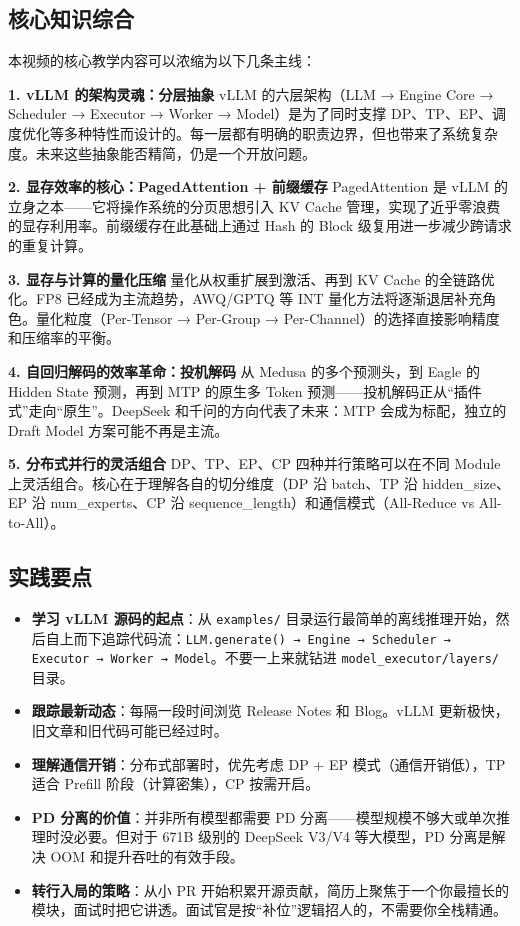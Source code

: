 \documentclass[a4paper]{article}
\begin{document}
\subsection{核心知识综合}

本视频的核心教学内容可以浓缩为以下几条主线：

\textbf{1. vLLM 的架构灵魂：分层抽象}
vLLM 的六层架构（LLM → Engine Core → Scheduler → Executor → Worker → Model）是为了同时支撑 DP、TP、EP、调度优化等多种特性而设计的。每一层都有明确的职责边界，但也带来了系统复杂度。未来这些抽象能否精简，仍是一个开放问题。

\textbf{2. 显存效率的核心：PagedAttention + 前缀缓存}
PagedAttention 是 vLLM 的立身之本——它将操作系统的分页思想引入 KV Cache 管理，实现了近乎零浪费的显存利用率。前缀缓存在此基础上通过 Hash 的 Block 级复用进一步减少跨请求的重复计算。

\textbf{3. 显存与计算的量化压缩}
量化从权重扩展到激活、再到 KV Cache 的全链路优化。FP8 已经成为主流趋势，AWQ/GPTQ 等 INT 量化方法将逐渐退居补充角色。量化粒度（Per-Tensor → Per-Group → Per-Channel）的选择直接影响精度和压缩率的平衡。

\textbf{4. 自回归解码的效率革命：投机解码}
从 Medusa 的多个预测头，到 Eagle 的 Hidden State 预测，再到 MTP 的原生多 Token 预测——投机解码正从``插件式''走向``原生''。DeepSeek 和千问的方向代表了未来：MTP 会成为标配，独立的 Draft Model 方案可能不再是主流。

\textbf{5. 分布式并行的灵活组合}
DP、TP、EP、CP 四种并行策略可以在不同 Module 上灵活组合。核心在于理解各自的切分维度（DP 沿 batch、TP 沿 hidden\_size、EP 沿 num\_experts、CP 沿 sequence\_length）和通信模式（All-Reduce vs All-to-All）。

\subsection{实践要点}

\begin{itemize}
    \item \textbf{学习 vLLM 源码的起点}：从 \texttt{examples/} 目录运行最简单的离线推理开始，然后自上而下追踪代码流：\texttt{LLM.generate() → Engine → Scheduler → Executor → Worker → Model}。不要一上来就钻进 \texttt{model\_executor/layers/} 目录。
    \item \textbf{跟踪最新动态}：每隔一段时间浏览 Release Notes 和 Blog。vLLM 更新极快，旧文章和旧代码可能已经过时。
    \item \textbf{理解通信开销}：分布式部署时，优先考虑 DP + EP 模式（通信开销低），TP 适合 Prefill 阶段（计算密集），CP 按需开启。
    \item \textbf{PD 分离的价值}：并非所有模型都需要 PD 分离——模型规模不够大或单次推理时没必要。但对于 671B 级别的 DeepSeek V3/V4 等大模型，PD 分离是解决 OOM 和提升吞吐的有效手段。
    \item \textbf{转行入局的策略}：从小 PR 开始积累开源贡献，简历上聚焦于一个你最擅长的模块，面试时把它讲透。面试官是按``补位''逻辑招人的，不需要你全栈精通。
\end{itemize}
\end{document}
